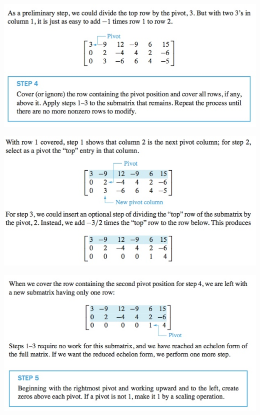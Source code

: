 \documentclass[12pt,letterpaper,reqno]{article}
\numberwithin{equation}{section}
\begin{document}
\begin{center}
\includegraphics[scale=0.8]{figures_mvc/algo_step_4}	
\end{center}

\begin{center}
\includegraphics[scale=0.8]{figures_mvc/algo_step_5}	
\end{center}

\begin{center}
\includegraphics[scale=0.8]{figures_mvc/algo_step_6}	
\end{center}
\end{document}
